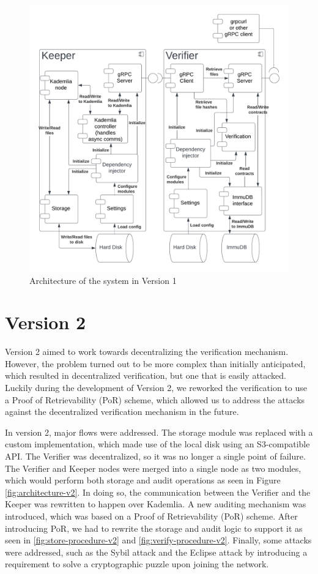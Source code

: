 \begin{figure}
    \centering
    \includegraphics[width=1\textwidth]{gfx/arch-v1.png}
    \caption{Architecture of the system in Version 1}
    \label{fig:architecture-v1}
\end{figure}

\section{Version 2}

Version 2 aimed to work towards decentralizing the verification mechanism.
However, the problem turned out to be more complex than initially anticipated,
which resulted in decentralized verification, but one that is easily attacked.
Luckily during the development of Version 2, we reworked the verification to use a Proof of Retrievability (PoR) scheme,
which allowed us to address the attacks against the decentralized verification mechanism in the future.

In version 2, major flows were addressed.
The storage module was replaced with a custom implementation, which made use of the local disk
using an S3-compatible API.
The Verifier was decentralized, so it was no longer a single point of failure.
The Verifier and Keeper nodes were merged into a single node as two modules,
which would perform both storage and audit operations as seen in Figure \ref{fig:architecture-v2}.
In doing so, the communication between the Verifier and the Keeper was rewritten to happen over Kademlia.
A new auditing mechanism was introduced, which was based on a Proof of Retrievability (PoR) scheme.
After introducing PoR, we had to rewrite the storage and audit logic to support it
as seen in \ref{fig:store-procedure-v2} and \ref{fig:verify-procedure-v2}.
Finally, some attacks were addressed, such as the Sybil attack and the Eclipse attack by introducing
a requirement to solve a cryptographic puzzle upon joining the network.


